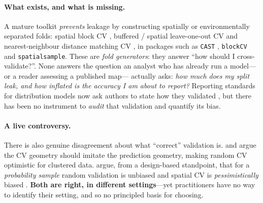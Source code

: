\documentclass[11pt,a4paper]{article}
\begin{document}
\paragraph{What exists, and what is missing.}
A mature toolkit \emph{prevents} leakage by constructing spatially or
environmentally separated folds: spatial block CV
\citep{roberts2017crossvalidation, valavi2019blockcv}, buffered / spatial
leave-one-out CV \citep{lerest2014sloo, telford2009evaluation} and nearest-neighbour
distance matching CV \citep[NNDM/kNNDM;][]{mila2022nndm, linnenbrink2024knndm}, in
packages such as \texttt{CAST} \citep{meyer2024cast}, \texttt{blockCV}
\citep{valavi2019blockcv} and \texttt{spatialsample}. These are \emph{fold
generators}: they answer ``how should I cross-validate?''. None answers the question
an analyst who has already run a model---or a reader assessing a published map---
actually asks: \emph{how much does my split leak, and how inflated is the accuracy I
am about to report?} Reporting standards for distribution models now ask authors to
state how they validated \citep{araujo2019standards, zurell2020odmap}, but there has
been no instrument to \emph{audit} that validation and quantify its bias.

\paragraph{A live controversy.}
There is also genuine disagreement about what ``correct'' validation is.
\citet{mila2022nndm} and \citet{linnenbrink2024knndm} argue the CV geometry should
imitate the prediction geometry, making random CV optimistic for clustered data.
\citet{wadoux2021spatial} argue, from a design-based standpoint, that for a
\emph{probability sample} random validation is unbiased and spatial CV is
\emph{pessimistically} biased \citep[see also][]{debruin2022clustered}.
\textbf{Both are right, in different settings}---yet practitioners have no way to
identify their setting, and so no principled basis for choosing.
\end{document}
